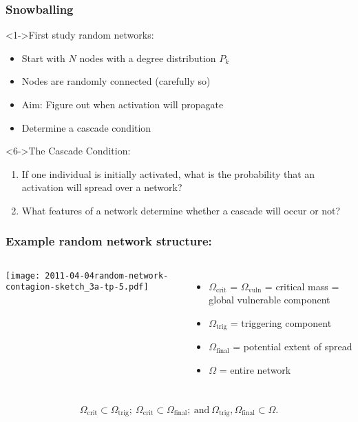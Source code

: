 \begin{frame}
  \frametitle{Snowballing}

  \begin{block}<1->{First study random networks:}
    \begin{itemize}
    \item<2-> Start with $N$ nodes with a degree distribution $P_k$
    \item<3-> Nodes are randomly connected (carefully so)
    \item<4-> Aim: Figure out when activation will propagate
    \item<5-> Determine a \alert{cascade condition}
    \end{itemize}
  \end{block}

  \begin{block}<6->{The Cascade Condition:}
    \begin{enumerate}
    \item<6->
      If one individual is initially activated,
      what is the probability that
      an activation will spread over a network?
    \item<7->
      What features of a network determine whether
      a cascade will occur or not?
    \end{enumerate}
  \end{block}

\end{frame}


\begin{frame}
  \frametitle{Example random network structure:}

  \begin{columns}
    \texttt{[image: 2011-04-04random-network-contagion-sketch\_3a-tp-5.pdf]}
    \begin{itemize}
    \item 
      $\Omega_{\textrm{crit}}$ = $\Omega_{\textrm{vuln}}$ = critical mass = global vulnerable component
    \item 
      $\Omega_{\textrm{trig}}$ = triggering component
    \item 
      $\Omega_{\textrm{final}}$ = potential extent of spread
    \item 
      $\Omega$ = entire network
    \end{itemize}
  \end{columns}
  \bigskip
  $$
  \Omega_{\textrm{crit}} 
  \subset
  \Omega_{\textrm{trig}};
  \
  \Omega_{\textrm{crit}} 
  \subset
  \Omega_{\textrm{final}};
  \
  \mbox{and}
  \
  \Omega_{\textrm{trig}},
  \Omega_{\textrm{final}} 
  \subset
  \Omega.
  $$
\end{frame}


